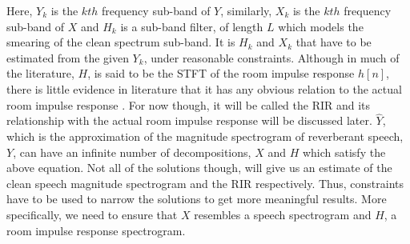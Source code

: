 Here, $Y_k$ is the $kth$ frequency sub-band of $Y$, similarly, $X_k$ is the $kth$ frequency sub-band of $X$ and $H_k$ is a sub-band filter, of length $L$ which models the smearing of the clean spectrum sub-band. It is $H_k$ and $X_k$ that have to be estimated from the given $Y_k$, under reasonable constraints. Although in much of the literature, $H$, is said to be the STFT of the room impulse response $h[n]$, there is little evidence in literature that it has any obvious relation to the actual room impulse response . For now though, it will be called the RIR and its relationship with the actual room impulse response will be discussed later. $\hat{Y}$, which is the approximation of the magnitude spectrogram of reverberant speech, $Y$, can have an infinite number of decompositions, $X$ and $H$ which satisfy the above equation. Not all of the solutions though, will give us an estimate of the clean speech magnitude spectrogram and the RIR respectively. Thus, constraints have to be used to narrow the solutions to get more meaningful results. More specifically, we need to ensure that $X$ resembles a speech spectrogram and $H$, a room impulse response spectrogram. 

